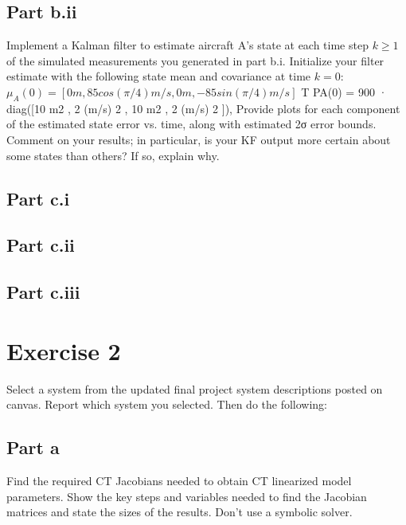 \documentclass[11pt]{article}
\begin{document}
\subsection*{Part b.ii}
Implement a Kalman filter to estimate aircraft A’s state at each time step $k \geq 1$ of
the simulated measurements you generated in part b.i. Initialize your filter estimate with
the following state mean and covariance at time $k = 0$: \\
$\mu_A(0) = [0 m, 85 cos(π/4) m/s, 0 m, −85 sin(π/4) m/s]$
T
PA(0) = 900 · diag([10 m2
, 2 (m/s)
2
, 10 m2
, 2 (m/s)
2
]),
Provide plots for each component of the estimated state error vs. time, along with
estimated 2σ error bounds. Comment on your results; in particular, is your KF output
more certain about some states than others? If so, explain why.

\subsection*{Part c.i}

\subsection*{Part c.ii}

\subsection*{Part c.iii}

\section*{Exercise 2}
Select a system from the updated final project system descriptions posted on canvas. Report which system you selected. Then do the following:

\subsection*{Part a}
Find the required CT Jacobians needed to obtain CT linearized model parameters. Show the key steps and variables needed to find the Jacobian matrices and state the sizes of the results. Don't use a symbolic solver.
\end{document}
